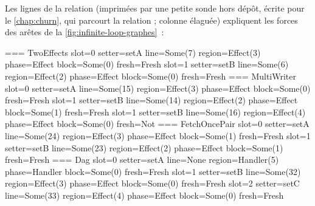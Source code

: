 Les lignes de la relation  (imprimées par une petite sonde hors dépôt, écrite pour le \cref{chap:churn}, qui parcourt la relation ; colonne  élaguée) expliquent les forces des arêtes de la \cref{fig:infinite-loop-graphes}~:

\begin{sortie}
=== TwoEffects
  slot=0 setter=setA line=Some(7) region=Effect(3) phase=Effect block=Some(0) fresh=Fresh
  slot=1 setter=setB line=Some(6) region=Effect(2) phase=Effect block=Some(0) fresh=Fresh
=== MultiWriter
  slot=0 setter=setA line=Some(15) region=Effect(3) phase=Effect block=Some(0) fresh=Fresh
  slot=1 setter=setB line=Some(14) region=Effect(2) phase=Effect block=Some(1) fresh=Fresh
  slot=1 setter=setB line=Some(16) region=Effect(4) phase=Effect block=Some(0) fresh=Not
=== FetchOncePair
  slot=0 setter=setA line=Some(24) region=Effect(3) phase=Effect block=Some(1) fresh=Fresh
  slot=1 setter=setB line=Some(23) region=Effect(2) phase=Effect block=Some(1) fresh=Fresh
=== Dag
  slot=0 setter=setA line=None    region=Handler(5) phase=Handler block=Some(0) fresh=Fresh
  slot=1 setter=setB line=Some(32) region=Effect(3) phase=Effect block=Some(0) fresh=Fresh
  slot=2 setter=setC line=Some(33) region=Effect(4) phase=Effect block=Some(0) fresh=Fresh
\end{sortie}

